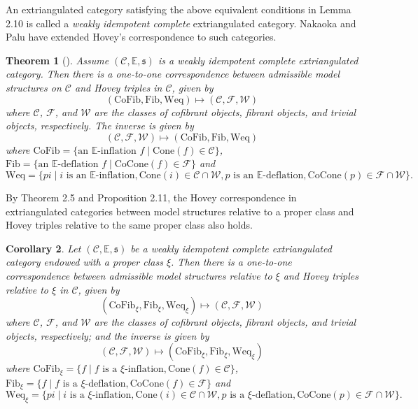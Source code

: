\documentclass[11pt,a4paper]{amsart}
\numberwithin{equation}{section}
\theoremstyle{plain}
\newtheorem{thm}{Theorem}[section]
\newtheorem{cor}[thm]{Corollary}
\begin{document}
An extriangulated category satisfying the above equivalent conditions in Lemma 2.10 is called a \emph{weakly idempotent complete} extriangulated category. Nakaoka and Palu \cite{NP} have extended Hovey's correspondence to such categories.

\begin{thm}[{\cite[Section 5]{NP}}]\label{thm:hovey}
	Assume $(\mathscr{C},\mathbb{E}, \mathfrak{s})$ is a weakly idempotent complete extriangulated category. Then there is a one-to-one correspondence between admissible model structures on $\mathscr{C}$ and Hovey triples in $\mathscr{C}$, given by
	$$(\mathrm{CoFib}, \mathrm{Fib}, \mathrm{Weq})\mapsto (\mathcal{C}, \mathcal{F}, \mathcal{W})$$
	where $\mathcal{C}$, $\mathcal{F}$, and $\mathcal{W}$ are the classes of cofibrant objects, fibrant objects, and trivial objects, respectively. The inverse is given by
	$$(\mathcal{C}, \mathcal{F}, \mathcal{W})\mapsto (\mathrm{CoFib}, \mathrm{Fib}, \mathrm{Weq})$$
	where $\mathrm{CoFib}=\{\text{an } \mathbb{E}\text{-inflation } f \mid \mathrm{Cone}(f)\in \mathcal{C}\}$, $\mathrm{Fib} =\{\text{an } \mathbb{E}\text{-deflation } f\mid \mathrm{CoCone}(f)\in \mathcal{F}\}$ and
	$$ \mathrm{Weq} =\{pi \mid i \text{ is an } \mathbb{E}\text{-inflation}, \mathrm{Cone}(i)\in \mathcal{C}\cap \mathcal{W}, p \text{ is an } \mathbb{E}\text{-deflation}, \mathrm{CoCone}(p)\in \mathcal{F}\cap \mathcal{W}\}. $$
\end{thm}

By Theorem 2.5 and Proposition 2.11, the Hovey correspondence in extriangulated categories between model structures relative to a proper class and Hovey triples relative to the same proper class also holds.    

\begin{cor}
	Let $(\mathscr{C},\mathbb{E},\mathfrak{s})$ be a weakly idempotent complete extriangulated category endowed with a proper class $\xi$. Then there is a one-to-one correspondence between admissible model structures relative to $\xi$ and Hovey triples relative to $\xi$ in $\mathscr{C}$, given by
	$$(\mathrm{CoFib}_\xi, \mathrm{Fib}_\xi, \mathrm{Weq}_\xi)\mapsto (\mathcal{C}, \mathcal{F}, \mathcal{W})$$
	where $\mathcal{C}$, $\mathcal{F}$, and $\mathcal{W}$ are the classes of cofibrant objects, fibrant objects, and trivial objects, respectively; and the inverse is given by
	$$(\mathcal{C}, \mathcal{F}, \mathcal{W})\mapsto (\mathrm{CoFib}_\xi, \mathrm{Fib}_\xi, \mathrm{Weq}_\xi)$$
	where $\mathrm{CoFib}_\xi=\{ f \mid f \text{ is a } \xi\text{-inflation}, \mathrm{Cone}(f)\in \mathcal{C} \}$, $\mathrm{Fib}_\xi =\{ f \mid f \text{ is a } \xi\text{-deflation}, \mathrm{CoCone}(f)\in \mathcal{F} \}$ and
	$$\mathrm{Weq}_\xi =\{pi \mid i \text{ is a } \xi\text{-inflation}, \mathrm{Cone}(i)\in \mathcal{C}\cap \mathcal{W}, p \text{ is a } \xi\text{-deflation}, \mathrm{CoCone}(p)\in \mathcal{F}\cap \mathcal{W}\}.$$
\end{cor}
\end{document}
